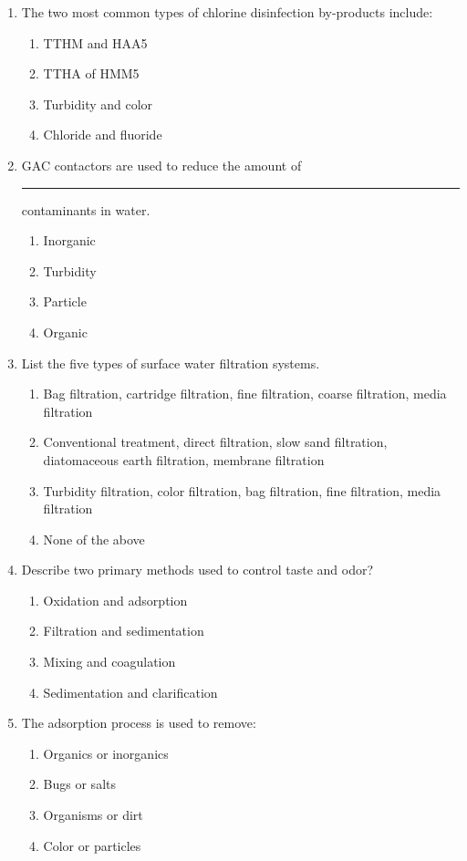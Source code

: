 \begin{enumerate}
\item The two most common types of chlorine disinfection by-products include:
\begin{enumerate}
\item TTHM and HAA5
\item TTHA of HMM5
\item Turbidity and color
\item Chloride and fluoride
\end{enumerate}

\item GAC contactors are used to reduce the amount of \rule{2cm}{0.5pt} contaminants in water.
\begin{enumerate}
\item Inorganic
\item Turbidity
\item Particle
\item Organic
\end{enumerate}

\item List the five types of surface water filtration systems.
\begin{enumerate}
\item Bag filtration, cartridge filtration, fine filtration, coarse filtration, media filtration
\item Conventional treatment, direct filtration, slow sand filtration, diatomaceous earth filtration, membrane filtration
\item Turbidity filtration, color filtration, bag filtration, fine filtration, media filtration
\item None of the above
\end{enumerate}

\item Describe two primary methods used to control taste and odor?
\begin{enumerate}
\item Oxidation and adsorption
\item Filtration and sedimentation
\item Mixing and coagulation
\item Sedimentation and clarification
\end{enumerate}

\item The adsorption process is used to remove:
\begin{enumerate}
\item Organics or inorganics
\item Bugs or salts
\item Organisms or dirt
\item Color or particles
\end{enumerate}


\end{enumerate}
